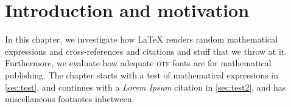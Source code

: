 \chapter{Introduction and motivation}\label{ch:test}\noindent
In this chapter, we investigate how LaTeX renders random mathematical expressions and cross-references and citations and stuff that we throw at it.
Furthermore, we evaluate how adequate \textsc{otf} fonts are for mathematical publishing.
The chapter starts with a test of mathematical expressions in \cref{sec:test}, and continues with a \emph{Lorem Ipsum} citation in \cref{sec:test2}, and has miscellaneous footnotes inbetween.



